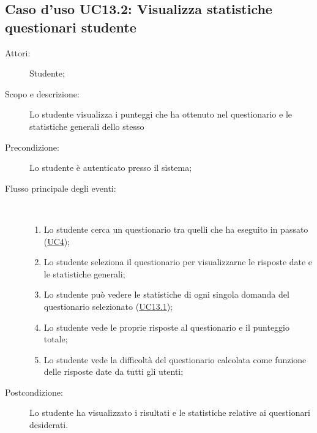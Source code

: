 \subsection{Caso d'uso UC13.2: Visualizza statistiche questionari studente}\begin{description}
	\item[Attori:] Studente;
	\item[Scopo e descrizione:] Lo studente visualizza i punteggi che ha ottenuto nel questionario e le statistiche generali dello stesso
	\item[Precondizione:] Lo studente è autenticato presso il sistema;
	
	\item[Flusso principale degli eventi:] \ 
	\begin{enumerate}
		\item Lo studente cerca un questionario tra quelli che ha eseguito in passato (\hyperlink{UC4}{UC4});
		\item Lo studente seleziona il questionario per visualizzarne le risposte date e le statistiche generali;
		\item Lo studente può vedere le statistiche di ogni singola domanda del questionario selezionato (\hyperlink{UC13.1}{UC13.1});
		\item Lo studente vede le proprie risposte al questionario e il punteggio totale;
		\item Lo studente vede la difficoltà del questionario calcolata come funzione delle risposte date da tutti gli utenti;
		
	\end{enumerate}
	\item[Postcondizione:] Lo studente ha visualizzato i risultati e le statistiche relative ai questionari desiderati.
\end{description}
\hypertarget{UC13.3}{}

